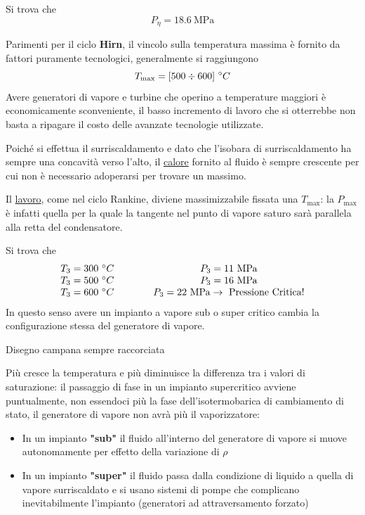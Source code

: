 \begin{adjustwidth}{2in}{}
	Si trova che 
	\[P_{\eta} = 18.6~\text{MPa}\]
	
	Parimenti per il ciclo \textbf{Hirn}, il vincolo sulla temperatura massima è fornito da fattori puramente tecnologici, generalmente si raggiungono
	\[T_{\max}=[500\div600]~\degree C\]
	Avere generatori di vapore e turbine che operino a temperature maggiori è economicamente sconveniente, il basso incremento di lavoro che si otterrebbe non basta a ripagare il costo delle avanzate tecnologie utilizzate. 
	
	Poiché si effettua il surriscaldamento e dato che l'isobara di surriscaldamento ha sempre una concavità verso l'alto, il \underline{calore} fornito al fluido è sempre crescente per cui non è necessario adoperarsi per trovare un massimo. 
	
	Il \underline{lavoro}, come nel ciclo Rankine, diviene massimizzabile fissata una $T_{\max}$: la $P_{\max}$ è infatti quella per la quale la tangente nel punto di vapore saturo sarà parallela alla retta del condensatore. 
	
	Si trova che 
	\[\begin{matrix}
		T_3 = 300 ~\degree C &\qquad&P_3 = 11~\text{MPa} \\
		T_3 = 500 ~\degree C &\qquad&P_3 = 16~\text{MPa} \\
		T_3 = 600 ~\degree C &\qquad&P_3 = 22~\text{MPa}\rightarrow~\text{Pressione Critica!} 
	\end{matrix}\]
	In questo senso avere un impianto a vapore sub o super critico cambia la configurazione stessa del generatore di vapore. 
	
	Disegno campana sempre raccorciata
	
	Più cresce la temperatura e più diminuisce la differenza tra i valori di saturazione: il passaggio di fase in un impianto supercritico avviene puntualmente, non essendoci più la fase dell'isotermobarica di cambiamento di stato, il generatore di vapore non avrà più il vaporizzatore:
	\begin{itemize}
		\item In un impianto \textbf{"sub"} il fluido all'interno del generatore di vapore si muove autonomamente per effetto della variazione di $\rho$ 
		\item In un impianto \textbf{"super"} il fluido passa dalla condizione di liquido a quella di vapore surriscaldato e si usano sistemi di pompe che complicano inevitabilmente l'impianto (generatori ad attraversamento forzato)
	\end{itemize}
	

\end{adjustwidth}
